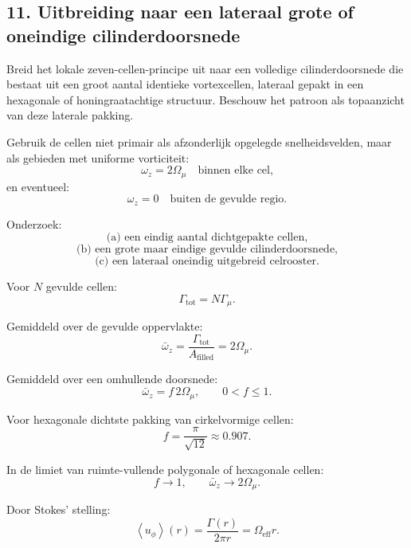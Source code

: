 \documentclass[11pt]{article}
\begin{document}
    \subsection{11. Uitbreiding naar een lateraal grote of oneindige cilinderdoorsnede}
        
        Breid het lokale zeven-cellen-principe uit naar een volledige cilinderdoorsnede die bestaat uit een groot aantal identieke vortexcellen, lateraal gepakt in een hexagonale of honingraatachtige structuur. Beschouw het patroon als topaanzicht van deze laterale pakking.
        
        Gebruik de cellen niet primair als afzonderlijk opgelegde snelheidsvelden, maar als gebieden met uniforme vorticiteit:
        \[
            \omega_z = 2\Omega_{\mu}
            \quad \text{binnen elke cel,}
        \]
        en eventueel:
        \[
            \omega_z = 0
            \quad \text{buiten de gevulde regio.}
        \]
        
        Onderzoek:
        \[
            \text{(a) een eindig aantal dichtgepakte cellen,}
        \]
        \[
            \text{(b) een grote maar eindige gevulde cilinderdoorsnede,}
        \]
        \[
            \text{(c) een lateraal oneindig uitgebreid celrooster.}
        \]
        
        Voor \(N\) gevulde cellen:
        \[
            \Gamma_{\mathrm{tot}}=N\Gamma_{\mu}.
        \]
        
        Gemiddeld over de gevulde oppervlakte:
        \[
            \bar{\omega}_z
            =
            \frac{\Gamma_{\mathrm{tot}}}{A_{\mathrm{filled}}}
            =
            2\Omega_{\mu}.
        \]
        
        Gemiddeld over een omhullende doorsnede:
        \[
            \bar{\omega}_z=f\,2\Omega_{\mu},
            \qquad
            0<f\leq1.
        \]
        
        Voor hexagonale dichtste pakking van cirkelvormige cellen:
        \[
            f=\frac{\pi}{\sqrt{12}}\approx0.907.
        \]
        
        In de limiet van ruimte-vullende polygonale of hexagonale cellen:
        \[
            f\rightarrow1,
            \qquad
            \bar{\omega}_z\rightarrow2\Omega_{\mu}.
        \]
        
        Door Stokes' stelling:
        \[
            \left\langle u_{\phi}\right\rangle(r)
            =
            \frac{\Gamma(r)}{2\pi r}
            =
            \Omega_{\mathrm{eff}}r.
        \]
        
\end{document}
